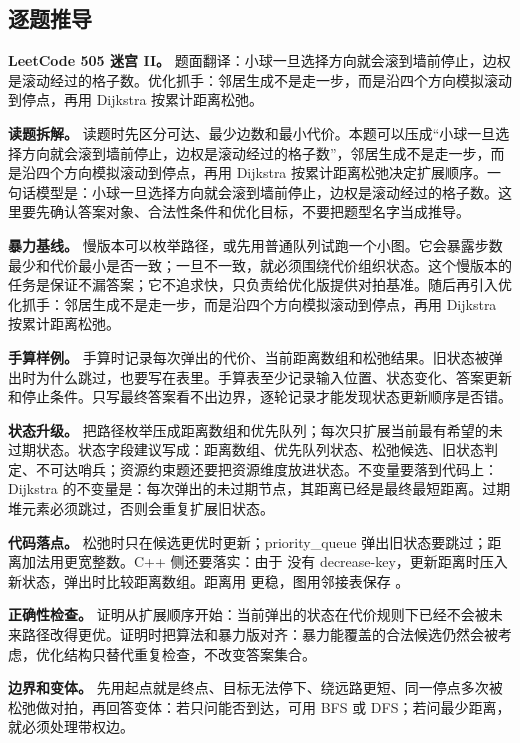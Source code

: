 \subsection{逐题推导}

\noindent\textbf{LeetCode 505 迷宫 II。} 题面翻译：小球一旦选择方向就会滚到墙前停止，边权是滚动经过的格子数。优化抓手：邻居生成不是走一步，而是沿四个方向模拟滚动到停点，再用 Dijkstra 按累计距离松弛。

\textbf{读题拆解。} 读题时先区分可达、最少边数和最小代价。本题可以压成“小球一旦选择方向就会滚到墙前停止，边权是滚动经过的格子数”，邻居生成不是走一步，而是沿四个方向模拟滚动到停点，再用 Dijkstra 按累计距离松弛决定扩展顺序。一句话模型是：小球一旦选择方向就会滚到墙前停止，边权是滚动经过的格子数。这里要先确认答案对象、合法性条件和优化目标，不要把题型名字当成推导。

\textbf{暴力基线。} 慢版本可以枚举路径，或先用普通队列试跑一个小图。它会暴露步数最少和代价最小是否一致；一旦不一致，就必须围绕代价组织状态。这个慢版本的任务是保证不漏答案；它不追求快，只负责给优化版提供对拍基准。随后再引入优化抓手：邻居生成不是走一步，而是沿四个方向模拟滚动到停点，再用 Dijkstra 按累计距离松弛。

\textbf{手算样例。} 手算时记录每次弹出的代价、当前距离数组和松弛结果。旧状态被弹出时为什么跳过，也要写在表里。手算表至少记录输入位置、状态变化、答案更新和停止条件。只写最终答案看不出边界，逐轮记录才能发现状态更新顺序是否错。

\textbf{状态升级。} 把路径枚举压成距离数组和优先队列；每次只扩展当前最有希望的未过期状态。状态字段建议写成：距离数组、优先队列状态、松弛候选、旧状态判定、不可达哨兵；资源约束题还要把资源维度放进状态。不变量要落到代码上：Dijkstra 的不变量是：每次弹出的未过期节点，其距离已经是最终最短距离。过期堆元素必须跳过，否则会重复扩展旧状态。

\textbf{代码落点。} 松弛时只在候选更优时更新；priority\_queue 弹出旧状态要跳过；距离加法用更宽整数。C++ 侧还要落实：由于  没有 decrease-key，更新距离时压入新状态，弹出时比较距离数组。距离用  更稳，图用邻接表保存 。

\textbf{正确性检查。} 证明从扩展顺序开始：当前弹出的状态在代价规则下已经不会被未来路径改得更优。证明时把算法和暴力版对齐：暴力能覆盖的合法候选仍然会被考虑，优化结构只替代重复检查，不改变答案集合。

\textbf{边界和变体。} 先用起点就是终点、目标无法停下、绕远路更短、同一停点多次被松弛做对拍，再回答变体：若只问能否到达，可用 BFS 或 DFS；若问最少距离，就必须处理带权边。

